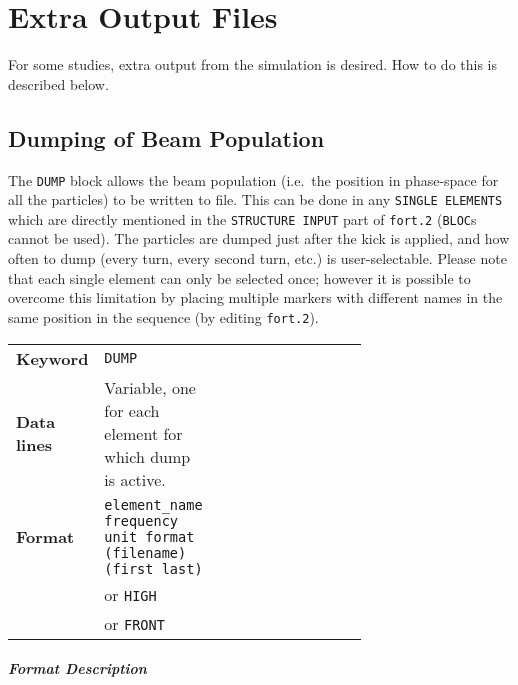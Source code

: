 
\chapter{Extra Output Files} \label{ExtraOutput}

For some studies, extra output from the simulation is desired.
How to do this is described below.

\section{Dumping of Beam Population} \label{sec:DUMP}

The \texttt{DUMP} block allows the beam population (i.e.\ the position in phase-space for all the particles) to be written to file.
This can be done in any \texttt{SINGLE ELEMENTS} which are directly mentioned in the \texttt{STRUCTURE INPUT} part of \texttt{fort.2} (\texttt{BLOC}s cannot be used).
The particles are dumped just after the kick is applied, and how often to dump (every turn, every second turn, etc.) is user-selectable.
Please note that each single element can only be selected once; however it is possible to overcome this limitation by placing multiple markers with different names in the same position in the sequence (by editing \texttt{fort.2}).




\bigskip
\begin{tabular}{@{}llp{0.7\linewidth}}
    \textbf{Keyword}    & \texttt{DUMP} \\
    \textbf{Data lines} & Variable, one for each element for which dump is active. \\
    \textbf{Format}     & \texttt{element\_name frequency unit format (filename) (first last)} \\
                        & or \texttt{HIGH} \\
                        & or \texttt{FRONT}
\end{tabular}

\paragraph{Format Description}~

